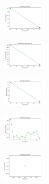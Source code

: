 \begin{figure}[H]
    \begin{subfigure}
        \centering
        \includegraphics[width=0.234\textwidth]{img/copkm/rand_set_const_20_277451237_cost.png}
    \end{subfigure}
    \hfill
    \begin{subfigure}
        \centering
        \includegraphics[width=0.234\textwidth]{img/copkm/newthyroid_set_const_20_277451237_cost.png}
    \end{subfigure}
    \hfill
    \begin{subfigure}
        \centering
        \includegraphics[width=0.234\textwidth]{img/copkm/iris_set_const_20_49258669_cost.png}
    \end{subfigure}
    \hfill
    \begin{subfigure}
        \centering
        \includegraphics[width=0.234\textwidth]{img/copkm/ecoli_set_const_20_49258669_cost.png}
    \end{subfigure}
    \hfill
    \begin{subfigure}
        \centering
        \includegraphics[width=0.234\textwidth]{img/copkm/rand_set_const_20_49258669_cost.png}
    \end{subfigure}
    \hfill
    \begin{subfigure}
        \centering

\end{subfigure}
\end{figure}

